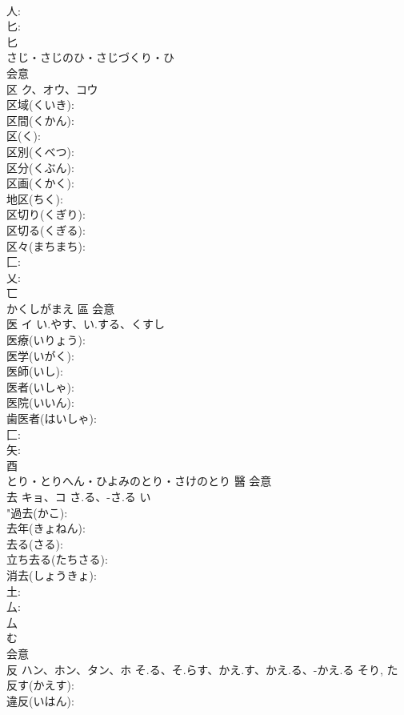 \documentclass[8pt]{extreport}
\begin{document}
\begin{CJK}{UTF8}{min}
\\	人: 
\\	匕: 
\\	匕	
\\	さじ・さじのひ・さじづくり・ひ	
\\	会意 
\\	区	ク、オウ、コウ			
\\	区域(くいき): 
\\	区間(くかん): 
\\	区(く): 
\\	区別(くべつ): 
\\	区分(くぶん): 
\\	区画(くかく): 
\\	地区(ちく): 
\\	区切り(くぎり): 
\\	区切る(くぎる): 
\\	区々(まちまち): 
\\	匚: 
\\	乂: 
\\	匸	
\\	かくしがまえ	區	会意 
\\	医	イ	い.やす、い.する、くすし		
\\	医療(いりょう): 
\\	医学(いがく): 
\\	医師(いし): 
\\	医者(いしゃ): 
\\	医院(いいん): 
\\	歯医者(はいしゃ): 
\\	匚: 
\\	矢: 
\\	酉	
\\	とり・とりへん・ひよみのとり・さけのとり	醫	会意 
\\	去	キョ、コ	さ.る、-さ.る	い	
\\	"過去(かこ): 
\\	去年(きょねん): 
\\	去る(さる): 
\\	立ち去る(たちさる): 
\\	消去(しょうきょ): 
\\	土: 
\\	厶: 
\\	厶	
\\	む	
\\	会意 
\\	反	ハン、ホン、タン、ホ	そ.る、そ.らす、かえ.す、かえ.る、-かえ.る	そり, た	
\\	反す(かえす): 
\\	違反(いはん): 

\end{CJK}
\end{document}
